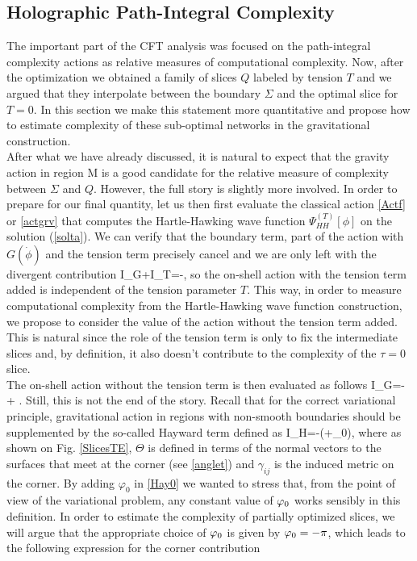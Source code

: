 \documentclass[a4paper,12pt]{article}
\begin{document}
\subsection{Holographic Path-Integral Complexity}\label{Sec:Hayward}
The important part of the CFT analysis was focused on the path-integral complexity actions as relative measures of computational complexity. Now, after the optimization we obtained a family of slices $Q$ labeled by tension $T$ and we argued that they interpolate between the boundary $\Sigma$ and the optimal slice for $T=0$. In this section we make this statement more quantitative and propose how to estimate complexity of these sub-optimal networks in the gravitational construction.\\
After what we have already discussed, it is natural to expect that the gravity action in region M is a good candidate for the relative measure of complexity between $\Sigma$ and $Q$. However, the full story is slightly more involved. In order to prepare for our final quantity, let us then first evaluate the classical action \eqref{Actf} or \eqref{actgrv} that computes the Hartle-Hawking wave function $\Psi^{(T)}_{HH}[\phi]$ on the solution  (\ref{solta}). We can verify that the boundary term, part of the action with $G(\dot{\phi})$ and the tension term precisely cancel and we are only left with the divergent contribution
\ba
I_G+I_T=-,
\ea
so the on-shell action with the tension term added is independent of the tension parameter $T$. This way, in order to measure computational complexity from the Hartle-Hawking wave function construction, we propose to consider the value of the action without the tension term added. This is natural since the role of the tension term is only to fix the intermediate slices and, by definition, it also doesn't contribute to the complexity of the $\tau=0$ slice.\\
 The on-shell action without the tension term is then evaluated as follows
\ba
I_G=-+
.\label{IGTC}
\ea
Still, this is not the end of the story. Recall that for the correct variational principle, gravitational action in regions with non-smooth boundaries should be supplemented by the so-called Hayward term \cite{Hayward:1993my} defined as
\be
I_H=-\int \sqrt{\gamma}(\Theta+\vp_0),\label{Hay0}
\ee
where as shown on Fig. \ref{SlicesTE}, $\Theta$ is defined in terms of the normal vectors to the surfaces that meet at the corner (see \eqref{anglet}) and $\gamma_{ij}$ is the induced metric on the corner. By adding $\varphi_0$ in \eqref{Hay0} we wanted to stress that, from the point of view of the variational problem, any constant value of $\varphi_0$ works sensibly in this definition. In order to estimate the complexity of partially optimized slices, we will argue that the appropriate choice of $\varphi_0$ is given by $\varphi_0=-\pi$, which leads to the following expression for the corner contribution
\end{document}
